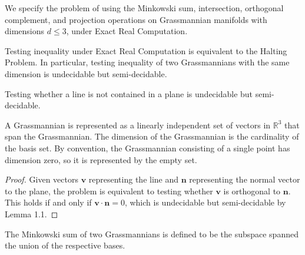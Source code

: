 \documentclass[12pt]{article}
\newcommand{\R}{\mathbb{R}}
\newenvironment{definition}[2][Definition]{\begin{trivlist}
\item[\hskip \labelsep {\bfseries #1}\hskip \labelsep {\bfseries #2.}]}{\end{trivlist}}
\newenvironment{corollary}[2][Corollary]{\begin{trivlist}
\item[\hskip \labelsep {\bfseries #1}\hskip \labelsep {\bfseries #2.}]}{\end{trivlist}}
\newenvironment{lemma}[2][Lemma]{\begin{trivlist}
\item[\hskip \labelsep {\bfseries #1}\hskip \labelsep {\bfseries #2.}]}{\end{trivlist}}
\begin{document}
 
 
\title{}
\author{Seokbin Lee, 20160464}
\maketitle

We specify the problem of using the Minkowski sum, intersection, orthogonal complement, and projection operations on Grassmannian manifolds with dimensions \(d \leq 3\), under Exact Real Computation.

\begin{lemma}{1.1}
Testing inequality under Exact Real Computation is equivalent to the Halting Problem. In particular, testing inequality of two Grassmannians with the same dimension is undecidable but semi-decidable.
\end{lemma}

\begin{corollary}{1.2}
Testing whether a line is not contained in a plane is undecidable but semi-decidable.
\end{corollary}

\begin{definition}{1.3}
A Grassmannian is represented as a linearly independent set of vectors in \(\R^3\) that span the Grassmannian. The dimension of the Grassmannian is the cardinality of the basis set. By convention, the Grassmannian consisting of a single point has dimension zero, so it is represented by the empty set.
\end{definition}

\begin{proof}
Given vectors \(\mathbf{v}\) representing the line and \(\mathbf{n}\) representing the normal vector to the plane, the problem is equivalent to testing whether \(\mathbf{v}\) is orthogonal to \(\mathbf{n}\). This holds if and only if \(\mathbf{v} \cdot \mathbf{n} = 0\), which is undecidable but semi-decidable by Lemma 1.1.
\end{proof}

\begin{definition}{2.1}
The Minkowski sum of two Grassmannians is defined to be the subspace spanned the union of the respective bases.
\end{definition}
\end{document}
